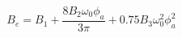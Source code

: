 \begin{equation}
B_{e} = B_{1} + \frac{8 B_{2} \omega_{0} \phi_{a}}{3 \pi} + 0.75 B_{3} \omega_{0}^{2} \phi_{a}^{2}
\end{equation}
